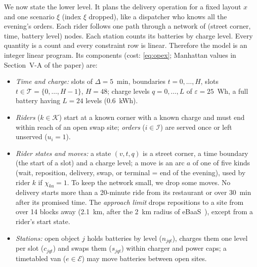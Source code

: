 We now state the lower level. It plans the delivery operation for a fixed layout $x$ and one scenario $\xi$ (index $\xi$ dropped), like a dispatcher who knows all the evening's orders. Each rider follows one path through a network of (street corner, time, battery level) nodes. Each station counts its batteries by charge level. Every quantity is a count and every constraint row is linear. Therefore the model is an integer linear program. Its components (cost: \eqref{eq:opex}; Manhattan values in Section~V-A of the paper) are:
\begin{itemize}
  \item \emph{Time and charge:} slots of $\Delta=5$~min, boundaries $t=0,\dots,H$, slots $t\in\mathcal T=\{0,\dots,H-1\}$, $H=48$; charge levels $q=0,\dots,L$ of $\varepsilon=25$~Wh, a full battery having $L=24$ levels (0.6~kWh).
  \item \emph{Riders} ($k\in\mathcal K$) start at a known corner with a known charge and must end within reach of an open swap site; \emph{orders} ($i\in\mathcal I$) are served once or left unserved ($u_i=1$).
  \item \emph{Rider states and moves:} a state $(v,t,q)$ is a street corner, a time boundary (the start of a slot) and a charge level; a move is an arc $a$ of one of five kinds (wait, reposition, delivery, swap, or terminal = end of the evening), used by rider $k$ if $\chi_{ka}=1$. To keep the network small, we drop some moves. No delivery starts more than a 20-minute ride from its restaurant or over 30~min after its promised time. The \emph{approach limit} drops repositions to a site from over 14 blocks away (2.1~km, after the 2~km radius of eBaaS~\cite{ding2025ebaas}), except from a rider's start state.
  \item \emph{Stations:} open object $j$ holds batteries by level ($n_{jqt}$), charges them one level per slot ($c_{jqt}$) and swaps them ($s_{jqt}$) within charger and power caps; a timetabled van ($e\in\mathcal E$) may move batteries between open sites.
\end{itemize}

